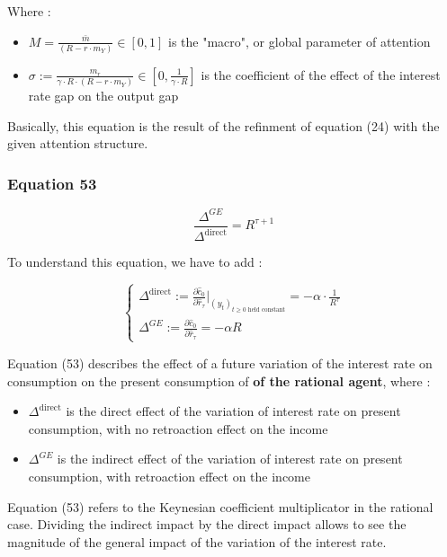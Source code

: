 \documentclass{article}
\begin{document}
Where : 
\begin{itemize}
    \item $M=\frac{\bar{m}}{(R-r\cdot m_{Y})}\in\left[0,1\right]$ is the "macro", or global parameter of attention
    \item $\sigma:=\frac{m_{r}}{\gamma\cdot R\cdot(R-r\cdot m_{Y})}\in\left[0,\frac{1}{\gamma\cdot R}\right]$ is the coefficient of the effect of the interest rate gap on the output gap
\end{itemize}

Basically, this equation is the result of the refinment of equation (24) with the given attention structure.

\subsubsection*{Equation 53}

\begin{equation}\tag{53}
    \frac{\Delta^{GE}}{\Delta^{\text{direct}}}=R^{\tau+1}
\end{equation}

To understand this equation, we have to add : 

\begin{equation*}
    \begin{cases}
        \Delta^{\text{direct}}:=\frac{\partial \hat{c}_{0}}{\partial \hat{r}_{\tau}}\bigg\rvert_{(y_{t})_{t\geq0 \text{ held constant}}} = -\alpha\cdot \frac{1}{R^{\tau}} \\
        \Delta^{GE}:=\frac{\partial \hat{c}_{0}}{\partial \hat{r}_{\tau}}=-\alpha R 
    \end{cases}
\end{equation*}

Equation (53) describes the effect of a future variation of the interest rate on consumption on the present consumption of \textbf{of the rational agent}, where :

\begin{itemize}
    \item $\Delta^{\text{direct}}$ is the direct effect of the variation of interest rate on present consumption, with no retroaction effect on the income
    \item $\Delta^{GE}$ is the indirect effect of the variation of interest rate on present consumption, with retroaction effect on the income
\end{itemize}

Equation (53) refers to the Keynesian coefficient multiplicator in the rational case. 
Dividing the indirect impact by the direct impact allows to see the magnitude of the general impact of the variation of the interest rate. 
\end{document}
